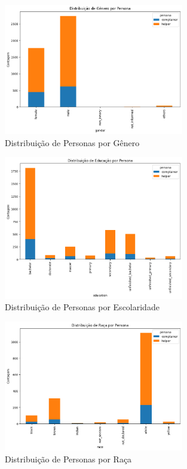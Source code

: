 \begin{figure}[htb]
    \centering
    \includegraphics[width=0.7\textwidth]{images/persona_gender.png}
    \caption{Distribuição de Personas por Gênero}
    \label{fig:persona_gender}
\end{figure}

\begin{figure}[htb]
    \centering
    \includegraphics[width=0.7\textwidth]{images/persona_education.png}
    \caption{Distribuição de Personas por Escolaridade}
    \label{fig:persona_education}
\end{figure}

\begin{figure}[htb]
    \centering
    \includegraphics[width=0.7\textwidth]{images/persona_race.png}
    \caption{Distribuição de Personas por Raça}
    \label{f
	ig:persona_race}
\end{figure}

